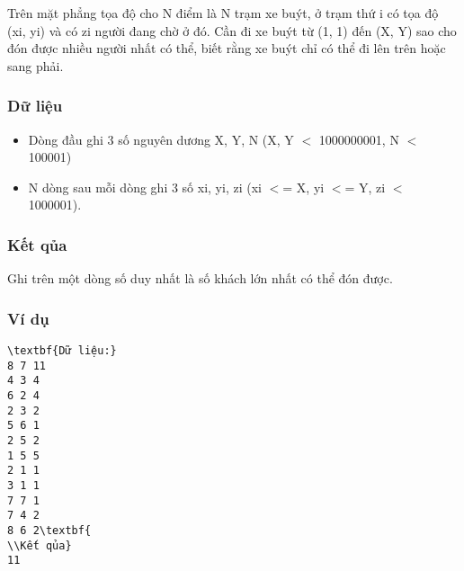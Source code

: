 



   Trên mặt phẳng tọa độ cho N điểm là N trạm xe buýt, ở trạm thứ i có tọa độ (xi, yi) và có zi người đang chờ ở đó. Cần đi xe buýt từ (1, 1) đến (X, Y) sao cho đón được nhiều người nhất có thể, biết rằng xe buýt chỉ có thể đi lên trên hoặc sang phải.  

\subsubsection{   Dữ liệu  }
\begin{itemize}
	\item     Dòng đầu ghi 3 số nguyên dương X, Y, N (X, Y $<$ 1000000001, N $<$ 100001)   
	\item     N dòng sau mỗi dòng ghi 3 số xi, yi, zi (xi $<$= X, yi $<$= Y, zi $<$ 1000001).   
\end{itemize}

\subsubsection{   Kết qủa  }

   Ghi trên một dòng số duy nhất là số khách lớn nhất có thể đón được.  

\subsubsection{   Ví dụ  }
\begin{verbatim}
\textbf{Dữ liệu:} 
8 7 11
4 3 4
6 2 4
2 3 2
5 6 1
2 5 2
1 5 5
2 1 1
3 1 1
7 7 1
7 4 2
8 6 2\textbf{
\\Kết qủa} 
11
\end{verbatim}